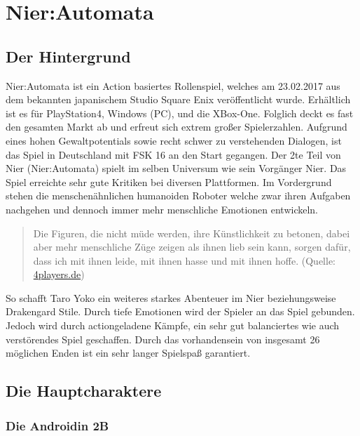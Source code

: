 \chapter{Nier:Automata}
\section{Der Hintergrund}
Nier:Automata ist ein Action basiertes Rollenspiel, welches am 23.02.2017 aus dem bekannten japanischem Studio Square Enix veröffentlicht wurde. Erhältlich ist es für PlayStation4, Windows (PC), und die XBox-One. Folglich deckt es fast den gesamten Markt ab und erfreut sich extrem großer Spielerzahlen. Aufgrund eines hohen Gewaltpotentials sowie recht schwer zu verstehenden Dialogen, ist das Spiel in Deutschland mit FSK 16 an den Start gegangen. Der 2te Teil von Nier (Nier:Automata) spielt im selben Universum wie sein Vorgänger Nier. Das Spiel erreichte sehr gute Kritiken bei diversen Plattformen. Im Vordergrund stehen die menschenähnlichen humanoiden Roboter welche zwar ihren Aufgaben nachgehen und dennoch immer mehr menschliche Emotionen entwickeln.

  \begin{quote}
	Die Figuren, die nicht müde werden, ihre Künstlichkeit zu betonen, dabei aber mehr menschliche Züge zeigen als ihnen lieb sein kann, sorgen dafür, dass ich mit ihnen leide, mit ihnen hasse und mit ihnen hoffe. (Quelle: \url{4players.de})
	\end{quote}

So schafft Taro Yoko ein weiteres starkes Abenteuer im Nier beziehungsweise Drakengard Stile. Durch tiefe Emotionen wird der Spieler an das Spiel gebunden. Jedoch wird durch actiongeladene Kämpfe, ein sehr gut balanciertes wie auch verstörendes Spiel geschaffen. 
Durch das vorhandensein von insgesamt 26 möglichen Enden ist ein sehr langer Spielspaß garantiert.

\section{Die Hauptcharaktere}

\subsection{Die Androidin 2B}


